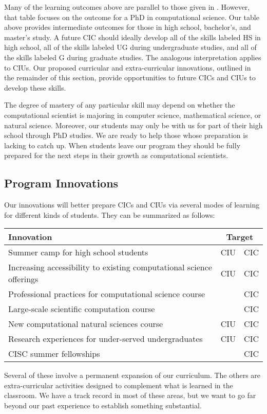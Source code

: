 \documentclass[11pt]{NSFamsart}
\begin{document}
Many of the learning outcomes above are parallel to those given in \cite[Table 1]{RudEtal18a}.  However, that table focuses on the outcome for a PhD in computational science.  Our table above provides intermediate outcomes for those in high school, bachelor's, and master's study.  A future CIC should ideally develop all of the skills labeled HS in high school, all of the skills labeled UG during undergraduate studies, and all of the skills labeled G during graduate studies.  The analogous interpretation applies to CIUs.  Our proposed curricular and extra-curricular innovations, outlined in the remainder of this section, provide opportunities to future CICs and CIUs to develop these skills.  

The degree of mastery of any particular skill may depend on whether the computational scientist is majoring in computer science, mathematical science, or natural science.  Moreover, our students may only be with us for part of their high school through PhD studies.  We are ready to help those whose preparation is lacking to catch up.  When students leave our program they should be fully prepared for the next steps in their growth as computational scientists.

\subsection{Program Innovations}
\newcommand{\CampName}{Summer camp for high school students}
\newcommand{\CurrExistName}{Increasing accessibility to existing computational science offerings}
\newcommand{\RelSoftName}{Professional practices for computational science course} 
\newcommand{\LargeSCName}{Large-scale scientific computation course}
\newcommand{\PhyChemBioCompSciName}{New computational natural sciences course}
\newcommand{\CODSummerName}{Research experiences for under-served undergraduates}
\newcommand{\FellowName}{CISC summer fellowships}

Our innovations will better prepare CICs and CIUs via several modes of learning for different kinds of students.  They can be summarized as follows:

\begin{center}
\begin{tabular}
{lcc}
Innovation & \multicolumn{2}{c}{Target} \tabularnewline
\toprule
\CampName & CIU & CIC \tabularnewline
\CurrExistName & CIU & CIC \tabularnewline
\RelSoftName &  & CIC \tabularnewline
\LargeSCName &  & CIC \tabularnewline
\PhyChemBioCompSciName & CIU & CIC \tabularnewline
\CODSummerName & CIU & CIC \tabularnewline
\FellowName &  & CIC \tabularnewline
\bottomrule
\end{tabular}
\end{center}
Several of these involve a permanent expansion of our curriculum. The others are extra-curricular activities designed to complement what is learned in the classroom.  We have a track record in most of these areas, but we want to go far beyond our past experience to establish something substantial.
\end{document}
